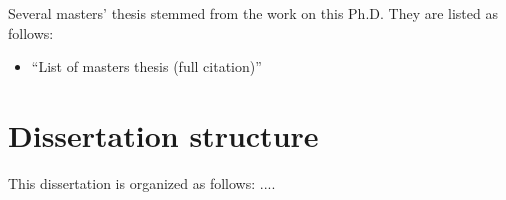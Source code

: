 Several masters' thesis stemmed from the work on this Ph.D. They are listed as follows:

\begin{itemize}
	\item ``List of masters thesis (full citation)''
\end{itemize}


\section{Dissertation structure} %
\label{sec:dissertation_structure}

This dissertation is organized as follows: ....

